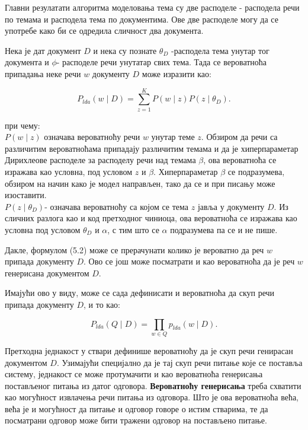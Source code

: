 Главни резулатати алгоритма моделовања тема су две расподеле - расподела речи по темама и расподела тема по документима. Ове две расподеле могу да се употребе како би се одредила сличност два документа.

Нека је дат документ $D$ и нека су познате $\theta_D$ -расподела тема унутар тог документа и $\phi$- расподеле речи унутатар свих тема. Тада се вероватноћа припадања неке речи $w$ документу $D$ може изразити као:

\begin{equation}
P_{lda}(w \mid D) = \sum_{z=1}^{K} P(w \mid z)P(z \mid \theta_D).
\end{equation}

при чему: \\

$ P(w \mid z)$ означава вероватноћу речи $w$ унутар теме $z$. Обзиром да речи са различитим вероватноћама припадају различитим темама и да је хиперпараметар Дирихлеове расподеле за расподелу речи над темама $\beta$, ова вероватноћа се изражава као условна, под условом $z$ и $\beta$. Хиперпараметар $\beta$ се подразумева, обзиром на начин како је модел направљен, тако да се и при писању може изоставити.\\
$P(z \mid \theta_D)$- означава вероватноћу са којом се тема $z$ јавља у документу $D$. Из сличних разлога као и код претходног чиниоца, ова вероватноћа се изражава као условна под условом $\theta_D$ и $\alpha$,  с тим што се $\alpha$ подразумева па се и не пише.

Дакле, формулом (5.2) може се прерачунати колико је вероватно да реч $w$ припада документу $D$. Ово се још може посматрати и као вероватноћа да је реч $w$ генерисана документом $D$.

Имајући ово у виду, може се сада дефинисати и вероватноћа да скуп речи припада документу  $D$, и то као:

\begin{equation}
P_{lda}(Q \mid D) = \prod_{w \in Q} p_{lda}(w \mid D).
\end{equation}

Претходна једнакост у ствари дефинише вероватноћу да је скуп речи генирасан документом $D$. Узимајући специјално да је тај скуп речи питање које се поставља систему, једнакост се може протумачити и као вероватноћа генерисања постављеног питања из датог одговора. \textbf{Вероватноћу генерисања} треба схватити као могућност извлачења речи питања из одговора.  Што је ова вероватноћа већа, већа је и могућност да питање и одговор говоре о истим стварима, те да посматрани одговор може бити тражени одговор на постављено питање.

